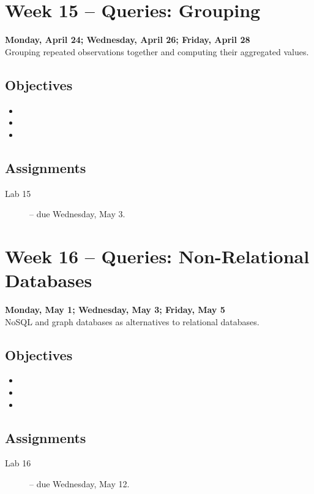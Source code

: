 \documentclass[10pt]{memoir}
\begin{document}
\section{Week 15 -- Queries: Grouping}
\textcolor{CUGold}{\textbf{Monday, April 24; Wednesday, April 26; Friday, April 28}}\\
Grouping repeated observations together and computing their aggregated values.

    \subsection{Objectives}
    \begin{itemize}
        \item 
        \item 
        \item 
    \end{itemize}

    \subsection{Assignments}
    \begin{description}%
        \item[Lab 15 ] -- due Wednesday, May 3.
    \end{description}
    
\section{Week 16 -- Queries: Non-Relational Databases}
\textcolor{CUGold}{\textbf{Monday, May 1; Wednesday, May 3; Friday, May 5}}\\
NoSQL and graph databases as alternatives to relational databases.

    \subsection{Objectives}
    \begin{itemize}
        \item 
        \item 
        \item 
    \end{itemize}

    \subsection{Assignments}
    \begin{description}%
        \item[Lab 16 ] -- due Wednesday, May 12.
    \end{description}
\end{document}

